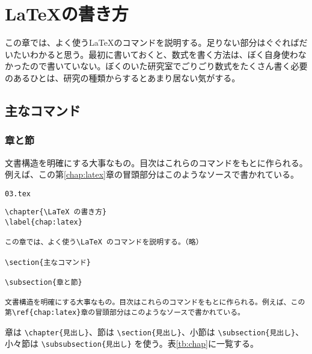 \chapter{\LaTeX の書き方}
\label{chap:design}

この章では、よく使う\LaTeX のコマンドを説明する。足りない部分はぐぐればだいたいわかると思う。最初に書いておくと、数式を書く方法は、ぼく自身使わなかったので書いていない。ぼくのいた研究室でごりごり数式をたくさん書く必要のあるひとは、研究の種類からするとあまり居ない気がする。

\section{主なコマンド}

\subsection{章と節}

文書構造を明確にする大事なもの。目次はこれらのコマンドをもとに作られる。例えば、この第\ref{chap:latex}章の冒頭部分はこのようなソースで書かれている。

\begin{itembox}[l]{{\tt 03.tex}}
\begin{verbatim}
\chapter{\LaTeX の書き方}
\label{chap:latex}

この章では、よく使う\LaTeX のコマンドを説明する。（略）

\section{主なコマンド}

\subsection{章と節}

文書構造を明確にする大事なもの。目次はこれらのコマンドをもとに作られる。例えば、この第\ref{chap:latex}章の冒頭部分はこのようなソースで書かれている。
\end{verbatim}
\end{itembox}

章は \verb|\chapter{見出し}|、節は \verb|\section{見出し}|、小節は \verb|\subsection{見出し}|、小々節は \verb|\subsubsection{見出し}| を使う。表\ref{tb:chap}に一覧する。

